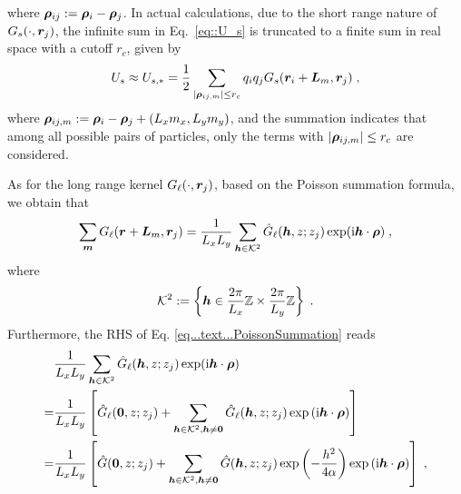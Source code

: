 where $\boldsymbol{\rho}_{ij}:=\bm{\rho}_i-\bm{\rho}_j$. 
In actual calculations, due to the short range nature of~$G_s(\cdot, \boldsymbol{r}_j)$, the infinite sum in Eq.~\eqref{eq::U_s} is truncated to a finite sum in real space with a cutoff $r_c$, given by
\begin{equation}\label{eq::U_s_truncated}
    U_s \approx U_{s, *} = \frac{1}{2}\sum_{\lvert\bm{\rho}_{ij, m}\rvert \leq r_c} q_i q_j G_s(\boldsymbol{r}_i+\bm{L}_m, \boldsymbol{r}_j)\;,
\end{equation}
where $\bm{\rho}_{ij, m}:=\bm{\rho}_i-\bm{\rho}_j+ (L_x m_x, L_y m_y)$, and the summation indicates that among all possible pairs of particles, only the terms with $\lvert\bm{\rho}_{ij, m}\rvert \leq r_c$ are considered.


 As for the long  range kernel $ G_\ell(\cdot, \boldsymbol{r}_j)$, based on the Poisson summation formula, we obtain that 
\begin{equation}\label{eq...text...PoissonSummation}
 \sum_{\bm{m}}  G_\ell(\boldsymbol{r}+\bm{L}_m, \boldsymbol{r}_j)  =\frac{1}{ L_xL_y}   \sum_{\boldsymbol{h}\in\mathcal{K}^2} \Hat{G}_\ell(\boldsymbol{h},z;z_j)\exp(\textrm{i}\boldsymbol{h}\cdot \bm{\rho}) \;,
\end{equation}
where \[\mathcal{K}^2 := \left\{\boldsymbol{h} \in \frac{  2\pi}{L_x}\mathbb{Z}\times \frac{  2\pi}{L_y}\mathbb{Z} \right\}\;.\]
Furthermore, the RHS of Eq. \eqref{eq...text...PoissonSummation} reads
\begin{align*}
&\frac{1}{ L_xL_y}   \sum_{\boldsymbol{h}\in\mathcal{K}^2} \Hat{G}_\ell(\boldsymbol{h},z;z_j)\exp(\textrm{i}\boldsymbol{h}\cdot \bm{\rho})\\
=& \frac{1}{ L_xL_y}   \left[\Hat{G}_\ell(\bm{0}, z; z_j)+\sum_{\boldsymbol{h}\in\mathcal{K}^2,\boldsymbol{h}\neq\bm{0}}  \hat{G}_\ell(\boldsymbol{h}, z; z_j)\exp{(\mathrm{i} \boldsymbol{h} \cdot \boldsymbol{\rho})}\right]\\
=&\frac{1}{ L_xL_y}   \left[\hat{G}(\bm{0}, z; z_j)+\sum_{\boldsymbol{h}\in\mathcal{K}^2,\boldsymbol{h}\neq\bm{0}}  \hat{G}(\boldsymbol{h}, z; z_j)\exp\left(-\frac{h^2}{4\alpha}\right)\exp{(\mathrm{i} \boldsymbol{h} \cdot \boldsymbol{\rho})}\right]\;,
\end{align*}
